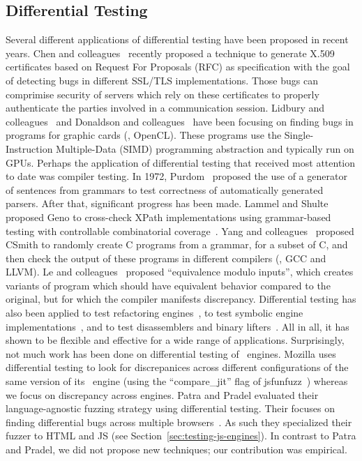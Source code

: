\documentclass[sigconf,review, anonymous]{acmart}
\begin{document}
\subsection{Differential Testing}
Several different applications of differential testing have been
proposed in recent years. Chen and
colleagues~\cite{Chen:2018:RDT:3180155.3180226} recently proposed a
technique to generate X.509 certificates based on Request For
Proposals (RFC) as specification with the goal of detecting bugs in
different SSL/TLS implementations. Those bugs can comprimise security
of servers which rely on these certificates to properly authenticate
the parties involved in a communication session. Lidbury and
colleagues~\cite{Lidbury:2015:MCF:2737924.2737986} and Donaldson and
colleagues~\cite{Donaldson:2017:ATG:3152284.3133917} have been
focusing on finding bugs in programs for graphic cards (\eg{},
OpenCL). These programs use the Single-Instruction Multiple-Data
(SIMD) programming abstraction and typically run on GPUs.  Perhaps the
application of differential testing that received most attention to
date was compiler testing. In 1972, Purdom~\cite{Purdom1972} proposed
the use of a generator of sentences from grammars to test correctness
of automatically generated parsers. After that, significant progress
has been made. Lammel and Shulte proposed Geno to cross-check XPath
implementations using grammar-based testing with controllable
combinatorial coverage~\cite{10.1007/11754008_2}. Yang and
colleagues~\cite{Yang:2011:FUB:1993498.1993532} proposed CSmith to
randomly create C programs from a grammar, for a subset of C, and then
check the output of these programs in different compilers (\eg{}, GCC
and LLVM). Le and colleagues~\cite{Le:2014:CVV:2594291.2594334}
proposed ``equivalence modulo inputs'', which creates variants of
program which should have equivalent behavior compared to the
original, but for which the compiler manifests
discrepancy. Differential testing has also been applied to test
refactoring engines~\cite{Daniel:2007:ATR:1287624.1287651}, to test
symbolic engine implementations~\cite{Kapus:2017:ATS:3155562.3155636},
and to test disassemblers and binary
lifters~\cite{Paleari:2010:NDD:1831708.1831741,Kim:2017:TIR:3155562.3155609}. All
in all, it has shown to be flexible and effective for a wide range of
applications. Surprisingly, not much work has been done on
differential testing of \js\ engines. Mozilla uses differential
testing to look for discrepanices across different configurations of
the same version of its \smonkey\ engine (using the ``compare\_jit''
flag of jsfunfuzz~\cite{jsfunfuzz}) whereas we focus on discrepancy
across engines. Patra and Pradel evaluated their language-agnostic
fuzzing strategy using differential testing. Their focuses on finding
differential bugs across multiple
browsers~\cite{patra2016learning}. As such they specialized their
fuzzer to HTML and JS (see Section~\ref{sec:testing-js-engines}). In
contrast to Patra and Pradel, we did not propose new techniques; our
contribution was empirical.
\end{document}
